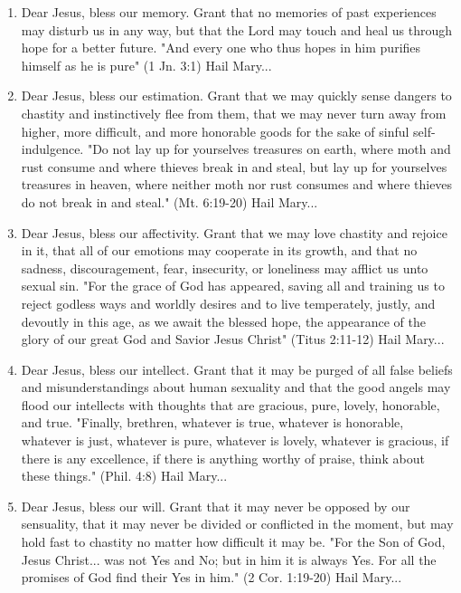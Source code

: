 \documentclass{article}
\begin{document}
\begin{multicols}{2}
\begin{enumerate}
\item Dear Jesus, bless our memory. Grant that no memories of past experiences may disturb us in any way, but that the Lord may touch and heal us through hope for a better future. "And every one who thus hopes in him purifies himself as he is pure" (1 Jn. 3:1) Hail Mary...

\item Dear Jesus, bless our estimation. Grant that we may quickly sense dangers to chastity and instinctively flee from them, that we may never turn away from higher, more difficult, and more honorable goods for the sake of sinful self-indulgence. "Do not lay up for yourselves treasures on earth, where moth and rust consume and where thieves break in and steal, but lay up for yourselves treasures in heaven, where neither moth nor rust consumes and where thieves do not break in and steal." (Mt. 6:19-20) Hail Mary...

\item Dear Jesus, bless our affectivity. Grant that we may love chastity and rejoice in it, that all of our emotions may cooperate in its growth, and that no sadness, discouragement, fear, insecurity, or loneliness may afflict us unto sexual sin. "For the grace of God has appeared, saving all and training us to reject godless ways and worldly desires and to live temperately, justly, and devoutly in this age, as we await the blessed hope, the appearance of the glory of our great God and Savior Jesus Christ" (Titus 2:11-12) Hail Mary...

\item Dear Jesus, bless our intellect. Grant that it may be purged of all false beliefs and misunderstandings about human sexuality and that the good angels may flood our intellects with thoughts that are gracious, pure, lovely, honorable, and true. "Finally, brethren, whatever is true, whatever is honorable, whatever is just, whatever is pure, whatever is lovely, whatever is gracious, if there is any excellence, if there is anything worthy of praise, think about these things." (Phil. 4:8) Hail Mary...

\item Dear Jesus, bless our will. Grant that it may never be opposed by our sensuality, that it may never be divided or conflicted in the moment, but may hold fast to chastity no matter how difficult it may be. "For the Son of God, Jesus Christ... was not Yes and No; but in him it is always Yes. For all the promises of God find their Yes in him." (2 Cor. 1:19-20) Hail Mary...


\end{enumerate}
\end{multicols}
\end{document}
